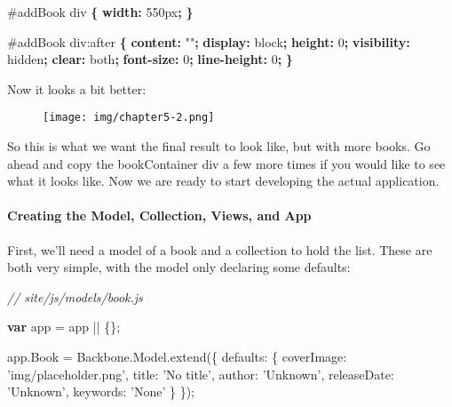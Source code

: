 \documentclass[9pt]{book}
\newenvironment{Shaded}{}{}
\newcommand{\KeywordTok}[1]{\textcolor[rgb]{0.00,0.44,0.13}{\textbf{{#1}}}}
\newcommand{\DataTypeTok}[1]{\textcolor[rgb]{0.56,0.13,0.00}{{#1}}}
\newcommand{\DecValTok}[1]{\textcolor[rgb]{0.25,0.63,0.44}{{#1}}}
\newcommand{\FloatTok}[1]{\textcolor[rgb]{0.25,0.63,0.44}{{#1}}}
\newcommand{\StringTok}[1]{\textcolor[rgb]{0.25,0.44,0.63}{{#1}}}
\newcommand{\CommentTok}[1]{\textcolor[rgb]{0.38,0.63,0.69}{\textit{{#1}}}}
\newcommand{\OtherTok}[1]{\textcolor[rgb]{0.00,0.44,0.13}{{#1}}}
\newcommand{\FunctionTok}[1]{\textcolor[rgb]{0.02,0.16,0.49}{{#1}}}
\newcommand{\NormalTok}[1]{{#1}}
\begin{document}
\begin{Shaded}
\begin{Highlighting}[]
\FloatTok{#addBook} \NormalTok{div }\KeywordTok{\{}
    \KeywordTok{width:} \DataTypeTok{550px}\KeywordTok{;}
\KeywordTok{\}}

\FloatTok{#addBook} \NormalTok{div}\DecValTok{:after} \KeywordTok{\{}
    \KeywordTok{content:} \StringTok{""}\KeywordTok{;}
    \KeywordTok{display:} \DataTypeTok{block}\KeywordTok{;}
    \KeywordTok{height:} \DataTypeTok{0}\KeywordTok{;}
    \KeywordTok{visibility:} \DataTypeTok{hidden}\KeywordTok{;}
    \KeywordTok{clear:} \DataTypeTok{both}\KeywordTok{;}
    \KeywordTok{font-size:} \DataTypeTok{0}\KeywordTok{;}
    \KeywordTok{line-height:} \DataTypeTok{0}\KeywordTok{;}
\KeywordTok{\}}
\end{Highlighting}
\end{Shaded}

Now it looks a bit better:

\begin{figure}[htbp]
\centering
\texttt{[image: img/chapter5-2.png]}
\end{figure}

So this is what we want the final result to look like, but with more
books. Go ahead and copy the bookContainer div a few more times if you
would like to see what it looks like. Now we are ready to start
developing the actual application.

\paragraph{Creating the Model, Collection, Views, and
App}\label{creating-the-model-collection-views-and-app}

First, we'll need a model of a book and a collection to hold the list.
These are both very simple, with the model only declaring some defaults:

\begin{Shaded}
\begin{Highlighting}[]
\CommentTok{// site/js/models/book.js}

\KeywordTok{var} \NormalTok{app = app || \{\};}

\OtherTok{app}\NormalTok{.}\FunctionTok{Book} \NormalTok{= }\OtherTok{Backbone}\NormalTok{.}\OtherTok{Model}\NormalTok{.}\FunctionTok{extend}\NormalTok{(\{}
    \DataTypeTok{defaults}\NormalTok{: \{}
        \DataTypeTok{coverImage}\NormalTok{: }\StringTok{'img/placeholder.png'}\NormalTok{,}
        \DataTypeTok{title}\NormalTok{: }\StringTok{'No title'}\NormalTok{,}
        \DataTypeTok{author}\NormalTok{: }\StringTok{'Unknown'}\NormalTok{,}
        \DataTypeTok{releaseDate}\NormalTok{: }\StringTok{'Unknown'}\NormalTok{,}
        \DataTypeTok{keywords}\NormalTok{: }\StringTok{'None'}
    \NormalTok{\}}
\NormalTok{\});}
\end{Highlighting}
\end{Shaded}
\end{document}
